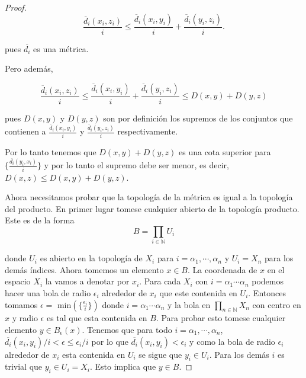 \documentclass[letter,twoside,12pt]{article}
\begin{document}
\begin{enumerate}
\begin{proof}
\begin{equation}
\frac{\overline{d}_i(x_i,z_i)}{i}\leq \frac{\overline{d}_i(x_i,y_i)}{i}+\frac{\overline{d}_i(y_i,z_i)}{i}  \nonumber.
\end{equation}

pues $ \overline{d_i} $ es una métrica.

Pero además,

\begin{equation}
\frac{\overline{d}_i(x_i,z_i)}{i}\leq \frac{\overline{d}_i(x_i,y_i)}{i}+\frac{\overline{d}_i(y_i,z_i)}{i}  \leq D(x,y)+D(y,z)\nonumber
\end{equation}

pues $ D(x,y) $ y $ D(y,z) $ son por definición los supremos de los conjuntos que contienen a $ \frac{\overline{d}_i(x_i,y_i)}{i} $ y $ \frac{\overline{d}_i(y_i,z_i)}{i} $ respectivamente.

Por lo tanto tenemos que $ D(x,y) + D(y,z)$ es una cota superior para $ \Big\{\frac{\overline{d_i}(y_i,x_i)}{i}\Big\} $ y por lo tanto el supremo debe ser menor, es decir, $ D(x,z) \leq D(x,y)+D(y,z) $. 

Ahora necesitamos probar que la topología de la métrica es igual a la topología del producto. En primer lugar tomese cualquier abierto de la topología producto. Este es de la forma
\begin{equation}
B=\prod_{i \in \mathbb{N}} U_i \nonumber
\end{equation}

donde $ U_i $ es abierto en la topología de $ X_i $ para $ i = \alpha_1, \cdots, \alpha_n $ y $U_i=X_n$ para los demás índices. Ahora tomemos un elemento $ x \in B $. La coordenada de $ x $ en el espacio $ X_i $ la vamos a denotar por $ x_i $. Para cada $X_{i} $ con $ i = \alpha_1 \cdots \alpha_n $ podemos hacer una bola de radio $ \epsilon_{i} $ alrededor de $ x_{i} $ que este contenida en $ U_{i} $.  Entonces tomamos $ \epsilon = $ min$ (\{\frac{\epsilon_{i}}{i}\}) $ donde $ i = \alpha_1 \cdots \alpha_n $ y la bola en $\prod_{n \in \mathbb{N}}X_n$ con centro en $ x $ y radio $ \epsilon $ es tal que esta contenida en $ B $. Para probar esto tomese cualquier elemento $y \in B_{\epsilon}(x)$. Tenemos que para todo $ i = \alpha_1, \cdots, \alpha_n$, $ \overline{d_i}(x_i,y_i)/i<\epsilon\leq\epsilon_i/i $ por lo que $ \overline{d_i}(x_i,y_i) < \epsilon_i$ y como la bola de radio $ \epsilon_i $ alrededor de $ x_i $ esta contenida en $ U_i $ se sigue que $y_i \in U_i$. Para los demás $ i $ es trivial que $ y_i \in U_i =X_i $. Esto implica que $y \in B$.


\end{proof}
\end{enumerate}
\end{document}
